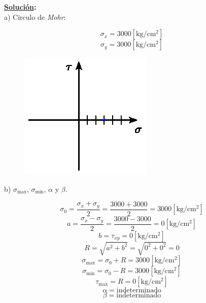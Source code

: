 \documentclass[letter,10pt,twoside]{article}
\begin{document}
\textbf{\underline{Solución}:} \\

a) Circulo de \emph{Mohr}:

\begin{equation*}
    \sigma_x = 3000[\text{kg}/\text{cm}^2]
\end{equation*}
\begin{equation*}
    \sigma_y = 3000[\text{kg}/\text{cm}^2]
\end{equation*}

\begin{figure}[H]
\centering
\includegraphics[scale=1.2]{resources/f51.eps}
\end{figure}

b) $\sigma_{\text{max}}$, $\sigma_{\text{min}}$, $\alpha$ y $\beta$.

\begin{equation*}
    \sigma_0 = \frac{\sigma_x + \sigma_y}{2}
             = \frac{3000 + 3000}{2}
             = 3000[\text{kg}/\text{cm}^2]
\end{equation*}
\begin{equation*}
    a = \frac{\sigma_x - \sigma_y}{2}
      = \frac{3000 - 3000}{2}
      = 0[\text{kg}/\text{cm}^2]
\end{equation*}
\begin{equation*}
    b = \tau_{xy}
      = 0[\text{kg}/\text{cm}^2]
\end{equation*}
\begin{equation*}
    R = \sqrt{a^2 + b^2}
      = \sqrt{0^2 + 0^2}
      = 0
\end{equation*}
\begin{equation*}
    \sigma_{\text{max}} = \sigma_0 + R
                        = 3000[\text{kg}/\text{cm}^2]
\end{equation*}
\begin{equation*}
    \sigma_{\text{min}} = \sigma_0 - R
                        = 3000[\text{kg}/\text{cm}^2]
\end{equation*}
\begin{equation*}
    \tau_{\text{max}} = R
                      = 0[\text{kg}/\text{cm}^2]
\end{equation*}
\begin{equation*}
    \alpha = \text{indeterminado}
\end{equation*}
\begin{equation*}
    \beta = \text{indeterminado}
\end{equation*}
\end{document}
